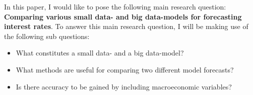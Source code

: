 In this paper, I would like to pose the following main research question:
\textbf{Comparing various small data- and big data-models for forecasting interest rates}. To answer this main research question, I will be making use of the following sub questions:
\begin{itemize}
	\item What constitutes a small data- and a big data-model?
	\item What methods are useful for comparing two different model forecasts?
	\item Is there accuracy to be gained by including macroeconomic variables?
\end{itemize}